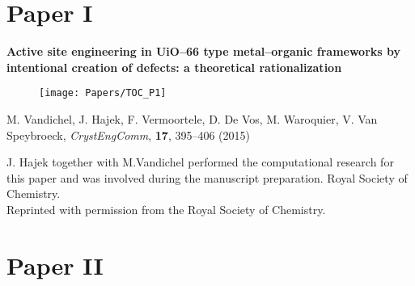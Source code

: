 \renewcommand\evenpagerightmark{{\scshape\small Published papers}}
\renewcommand\oddpageleftmark{{\scshape\small Chapter 5}}




\clearpage

\section*{Paper I}
\vspace{0.1\textheight}
{
\large
\textbf{Active site engineering in UiO--66 type metal--organic frameworks by
intentional creation of defects: a theoretical rationalization} }
\begin{figure}[h!]
	\centering
	\texttt{[image: Papers/TOC\_P1]}
\end{figure}
 
\noindent M. Vandichel, J. Hajek, F. Vermoortele, D. De Vos, M. Waroquier, V.
Van Speybroeck, \textit{CrystEngComm}, \textbf{17}, 395--406 (2015) 



\vfill
\noindent J. Hajek together with M.Vandichel performed the computational
research for this paper and was involved during the manuscript preparation.
\npar
\noindent {} Royal Society of Chemistry. \\
Reprinted with permission from the Royal Society of Chemistry.

\clearpage{\pagestyle{empty}\cleardoublepage}

 

\clearpage{\pagestyle{empty}\cleardoublepage}

\section*{Paper II}

